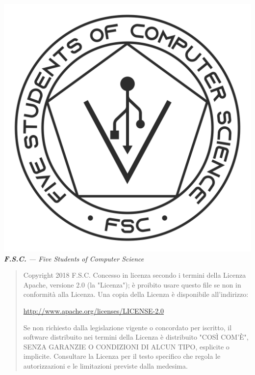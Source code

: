 \begin{titlepage}
		\clearpage
		\vspace*{\fill}
		\includegraphics[height=0.4\textwidth]{Logo_FSC_WhiteBg}\\[0.5cm]
		\textit{\textbf{F.S.C.} --- Five Students of Computer Science}
		
		\vspace*{5cm}
		
		\begin{flushleft}
			\begin{minipage}{\textwidth}%
				\begin{quote}
					\scriptsize Copyright \textcopyright{} 2018 F.S.C.
					\vskip15pt
					Concesso in licenza secondo i termini della Licenza Apache, versione 2.0 (la "Licenza"); è proibito usare questo file se non in conformità alla Licenza. Una copia della Licenza è disponibile all'indirizzo:
					\vskip5pt
					\begin{center}
						\url{http://www.apache.org/licenses/LICENSE-2.0}
					\end{center}
					\vskip5pt
					Se non richiesto dalla legislazione vigente o concordato per iscritto, il software distribuito nei termini della Licenza è distribuito "COSÌ COM'È", SENZA GARANZIE O CONDIZIONI DI ALCUN TIPO, esplicite o implicite. Consultare la Licenza per il testo specifico che regola le autorizzazioni e le limitazioni previste dalla medesima.
				\end{quote}
			\end{minipage}
		\end{flushleft}

		\vspace*{\fill}
		
	\end{titlepage}
